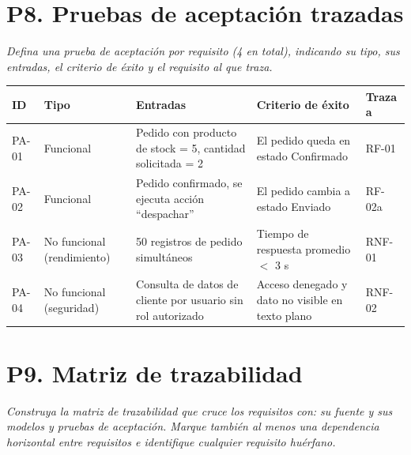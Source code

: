 \documentclass[11pt]{article}
\begin{document}
\newpage

\section*{P8. Pruebas de aceptación trazadas}

\textit{Defina una prueba de aceptación por requisito (4 en total), indicando su tipo, sus entradas, el criterio de éxito y el requisito al que traza.}

\begin{center}
\small
\begin{tabular}{|p{1.3cm}|p{2.3cm}|p{4cm}|p{3.7cm}|p{1.5cm}|}
\hline
\textbf{ID} & \textbf{Tipo} & \textbf{Entradas} & \textbf{Criterio de éxito} & \textbf{Traza a} \\
\hline
PA-01 & Funcional & Pedido con producto de stock = 5, cantidad solicitada = 2 & El pedido queda en estado Confirmado & RF-01 \\
\hline
PA-02 & Funcional & Pedido confirmado, se ejecuta acción ``despachar'' & El pedido cambia a estado Enviado & RF-02a \\
\hline
PA-03 & No funcional (rendimiento) & 50 registros de pedido simultáneos & Tiempo de respuesta promedio $<$ 3 s & RNF-01 \\
\hline
PA-04 & No funcional (seguridad) & Consulta de datos de cliente por usuario sin rol autorizado & Acceso denegado y dato no visible en texto plano & RNF-02 \\
\hline
\end{tabular}
\end{center}

\section*{P9. Matriz de trazabilidad}

\textit{Construya la matriz de trazabilidad que cruce los requisitos con: su fuente y sus modelos y pruebas de aceptación. Marque también al menos una dependencia horizontal entre requisitos e identifique cualquier requisito huérfano.}
\end{document}
